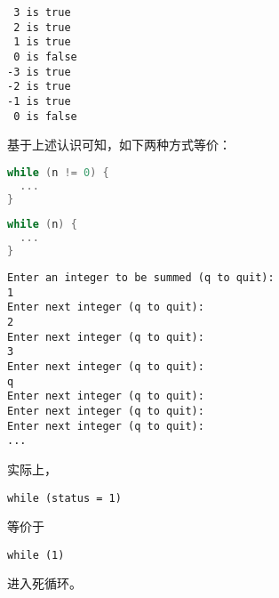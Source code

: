 \begin{frame}[fragile]
  \begin{lstlisting}
 3 is true
 2 is true
 1 is true
 0 is false
-3 is true
-2 is true
-1 is true
 0 is false
\end{lstlisting}    

\end{frame}

\begin{frame}[fragile]

\end{frame}

\begin{frame}[fragile]
基于上述认识可知，如下两种方式等价： \vspace{.1in}

\begin{minipage}{.45\textwidth}
\begin{lstlisting}[language=c,backgroundcolor=\color{red!10}]
while (n != 0) {
  ...
}
\end{lstlisting}
\end{minipage}\hfill 
\begin{minipage}{.45\textwidth}
\begin{lstlisting}[language=c,backgroundcolor=\color{red!10}]
while (n) {
  ...
}
\end{lstlisting}
\end{minipage}
\end{frame}


\begin{frame}

\end{frame}

\begin{frame}[fragile]
\begin{lstlisting}
Enter an integer to be summed (q to quit): 
1
Enter next integer (q to quit): 
2
Enter next integer (q to quit): 
3
Enter next integer (q to quit): 
q
Enter next integer (q to quit): 
Enter next integer (q to quit): 
Enter next integer (q to quit):
... 
\end{lstlisting}
\end{frame}

\begin{frame}[fragile]
实际上，
\begin{lstlisting}
while (status = 1) 
\end{lstlisting}
等价于
\begin{lstlisting}
while (1) 
\end{lstlisting}
进入死循环。
\end{frame}

